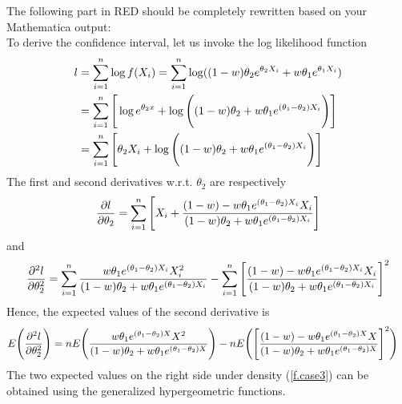 \documentclass[11pt]{article}
\newcommand{\cred}{ \color{red}}
\begin{document}
{\cred The following part in RED should be completely rewritten based on your Mathematica output:\\

To derive the confidence interval, let us invoke the log likelihood function
\begin{align}
\label{}
   l&=\sum^n_{i=1}\log f(X_i)=\sum^n_{i=1}\log ((1-w)\theta_2 e^{\theta_2 X_i}+w\theta_1 e^{\theta_1 X_i})  \\
   &=\sum^n_{i=1}\Bigg{[} \log  e^{\theta_2 x}+\log \Bigg{(}(1-w)\theta_2+w \theta_1 e^{(\theta_1-\theta_2)X_i}\Bigg{)}  \Bigg{]} \\
      &=\sum^n_{i=1}\Bigg{[} \theta_2 X_i+\log \Bigg{(}(1-w)\theta_2+w \theta_1 e^{(\theta_1-\theta_2)X_i}\Bigg{)}  \Bigg{]} 
\end{align}
The first and second derivatives w.r.t. $\theta_2$ are respectively
\begin{align}
\label{}
\frac{\partial l}{\partial \theta_2}    &=\sum^n_{i=1}\Bigg{[} X_i + \frac{(1-w)-w \theta_1 e^{(\theta_1-\theta_2)X_i}X_i}{(1-w)\theta_2+w \theta_1 e^{(\theta_1-\theta_2)X_i}}  \Bigg{]}  \\  
\end{align}
and
\begin{align}
\label{}
\frac{\partial^2 l}{\partial \theta_2^2}    &=\sum^n_{i=1}\frac{w \theta_1 e^{(\theta_1-\theta_2)X_i}X^2_i}{(1-w)\theta_2+w \theta_1 e^{(\theta_1-\theta_2)X_i} } -\sum^n_{i=1}\Bigg{[} \frac{(1-w)-w \theta_1 e^{(\theta_1-\theta_2)X_i}X_i}{(1-w)\theta_2+w \theta_1 e^{(\theta_1-\theta_2)X_i} }\Bigg{]}^2  \\  
\end{align}
Hence, the expected values of the second derivative is
\begin{align}
\label{}
    E\Bigg{(} \frac{\partial^2 l}{\partial \theta_2^2}    \Bigg{)}    &=  n E \Bigg{(}\frac{w \theta_1 e^{(\theta_1-\theta_2)X}X^2}{(1-w)\theta_2+w \theta_1 e^{(\theta_1-\theta_2)X} }\Bigg{)} -nE \Bigg{(}\Bigg{[} \frac{(1-w)-w \theta_1 e^{(\theta_1-\theta_2)X}X}{(1-w)\theta_2+w \theta_1 e^{(\theta_1-\theta_2)X} }\Bigg{]}^2\Bigg{)}   
\end{align}
The two expected values on the right side under density (\ref{f.case3}) can be obtained using the generalized hypergeometric functions. \\

}%
\end{document}
